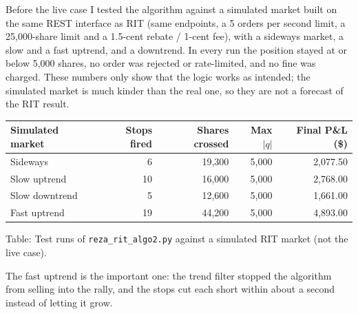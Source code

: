 \documentclass{article}
\begin{document}

Before the live case I tested the algorithm against a simulated market built on the same REST
interface as RIT (same endpoints, a 5 orders per second limit, a 25,000-share limit and a
1.5-cent rebate / 1-cent fee), with a sideways market, a slow and a fast uptrend, and a downtrend. In
every run the position stayed at or below 5,000 shares, no order was rejected or rate-limited, and no
fine was charged. These numbers only show that the logic works as intended; the simulated market is
much kinder than the real one, so they are not a forecast of the RIT result.

\begin{center}
\begin{tabular}{|l|r|r|r|r|}
\hline
Simulated market & Stops fired & Shares crossed & Max $|q|$ & Final P\&L (\$) \\
\hline
Sideways          &  6 & 19,300 & 5,000 & 2,077.50 \\
Slow uptrend      & 10 & 16,000 & 5,000 & 2,768.00 \\
Slow downtrend    &  5 & 12,600 & 5,000 & 1,661.00 \\
Fast uptrend      & 19 & 44,200 & 5,000 & 4,893.00 \\
\hline
\end{tabular}

\smallskip
Table: Test runs of \texttt{reza\_rit\_algo2.py} against a simulated RIT market (not the live case).
\end{center}

The fast uptrend is the important one: the trend filter stopped the algorithm from selling into the
rally, and the stops cut each short within about a second instead of letting it grow.
\end{document}
